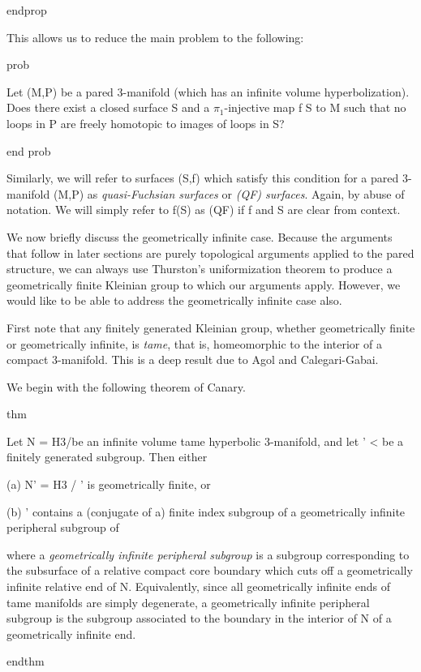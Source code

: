 \begin{prob}
endprop

This allows us to reduce the main problem to the following:

prob

Let (M,P) be a pared 3-manifold (which has an infinite volume hyperbolization).
Does there exist a closed surface S and a $\pi_1$-injective map f \colon S to M such
that no loops in P are freely homotopic to images of loops in S?

end prob

Similarly, we will refer to surfaces (S,f) which satisfy this condition for
a pared 3-manifold (M,P) as \emph{quasi-Fuchsian surfaces} or \emph{(QF)
surfaces}.  Again, by abuse of notation. We will simply refer to f(S) as (QF)
if f and S are clear from context.

We now briefly discuss the geometrically infinite case. Because the arguments
that follow in later sections are purely topological arguments applied to the
pared structure, we can always use Thurston's uniformization theorem to produce
a geometrically finite Kleinian group to which our arguments apply. However, we
would like to be able to address the geometrically infinite case also.

First note that any finitely generated Kleinian group, whether geometrically
finite or geometrically infinite, is \emph{tame}, that is, homeomorphic to the
interior of a compact 3-manifold. This is a deep result due to Agol and
Calegari-Gabai.

We begin with the following theorem of Canary.

thm

Let N = H3/\Ga be an infinite volume tame hyperbolic 3-manifold, and let
\Ga' < \Ga be a finitely generated subgroup. Then either

(a) N' = H3 / \Ga' is geometrically finite, or

(b) \Ga' contains a (conjugate of a) finite index subgroup of a geometrically
infinite peripheral subgroup of \Ga

where a \emph{geometrically infinite peripheral subgroup} is a subgroup
corresponding to the subsurface of a relative compact core boundary which cuts
off a geometrically infinite relative end of N. Equivalently, since all
geometrically infinite ends of tame manifolds are simply degenerate,
a geometrically infinite peripheral subgroup is the subgroup associated to the
boundary in the interior of N of a geometrically infinite end.

endthm


\end{prob}
